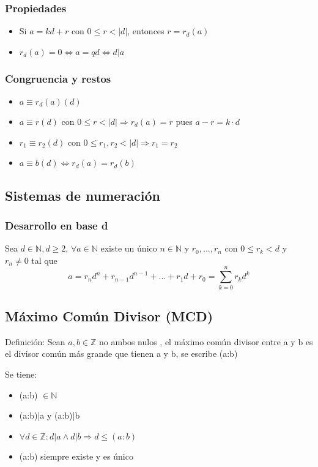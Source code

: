 \documentclass{article}
\begin{document}
\subsubsection{Propiedades}
\begin{itemize}
    \item Si $a = kd + r$ con $0 \leq r < |d|$, entonces $r = r_d (a)$
    \item $r_d(a) = 0 \iff a = qd \iff d | a$
\end{itemize}
\subsubsection{Congruencia y restos}
\begin{itemize}
    \item $a \equiv r_d(a) (d)$
    \item $a \equiv r (d)$ con $0 \leq r < |d| \Rightarrow r_d(a) = r$ pues $a-r=k \cdot d$
    \item $r_1 \equiv r_2 (d)$ con $0 \leq r_1,r_2 < |d| \Rightarrow r_1 = r_2$
    \item $a \equiv b (d) \iff r_d (a) = r_d (b)$
\end{itemize}
\subsection{Sistemas de numeración}
\subsubsection{Desarrollo en base d}
Sea $d \in \mathbb{N}, d \geq 2$, $\forall a \in \mathbb{N}$ existe un único $n \in \mathbb{N}$ y $r_0,...,r_n$ con $0 \leq r_k < d$ y $r_n \neq 0$ tal que \begin{equation}
    a = r_nd^n + r_{n-1}d^{n-1}+...+r_1d + r_0 = \sum_{k=0}^n r_kd^k
\end{equation}

\subsection{Máximo Común Divisor (MCD)}
Definición: Sean $a,b \in \mathbb{Z}$ no ambos nulos , el máximo común divisor entre a y b es el divisor común más grande que tienen a y b, se escribe (a:b)

Se tiene: \begin{itemize}
    \item (a:b) $\in \mathbb{N}$
    \item (a:b)|a  y (a:b)|b
    \item $\forall d \in \mathbb{Z}: d|a \land d|b \Rightarrow d \leq (a:b)$
    \item (a:b) siempre existe y es único
\end{itemize}
\end{document}
